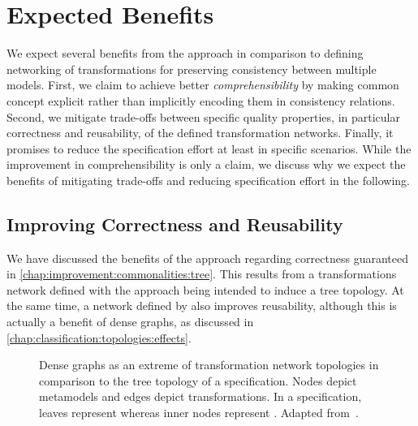 \section{Expected Benefits}
\label{chap:improvement:benefits}

We expect several benefits from the \commonalities approach in comparison to defining networking of transformations for preserving consistency between multiple models.
First, we claim to achieve better \emph{comprehensibility} by making common concept explicit rather than implicitly encoding them in consistency relations.
Second, we mitigate trade-offs between specific quality properties, in particular correctness and reusability, of the defined transformation networks.
Finally, it promises to reduce the specification effort at least in specific scenarios.
While the improvement in comprehensibility is only a claim, we discuss why we expect the benefits of mitigating trade-offs and reducing specification effort in the following.


\subsection{Improving Correctness and Reusability}

We have discussed the benefits of the \commonalities approach regarding correctness guaranteed in \autoref{chap:improvement:commonalities:tree}.
This results from a transformations network defined with the \commonalities approach being intended to induce a tree topology.
At the same time, a network defined by \commonalities also improves reusability, although this is actually a benefit of dense graphs, as discussed in \autoref{chap:classification:topologies:effects}.

\begin{figure}
    \centering
    \begin{minipage}[b]{0.49\columnwidth}
        \centering
        
        \label{fig:improvement:topologies:full}
    \end{minipage}
    \hfill
    \begin{minipage}[b]{0.49\columnwidth}
        \centering
        
        \vspace{1em}
        \label{fig:improvement:topologies:tree}
    \end{minipage}
    \caption[Benefit of \commonalities regarding quality trade-offs]{Dense graphs as an extreme of transformation network topologies in comparison to the tree topology of a \commonalities specification. Nodes depict metamodels and edges depict transformations. In a \commonalities specification, leaves represent \concretemetamodels whereas inner nodes represent \conceptmetamodels. Adapted from~.}
    \label{fig:improvement:topologies}
\end{figure}


